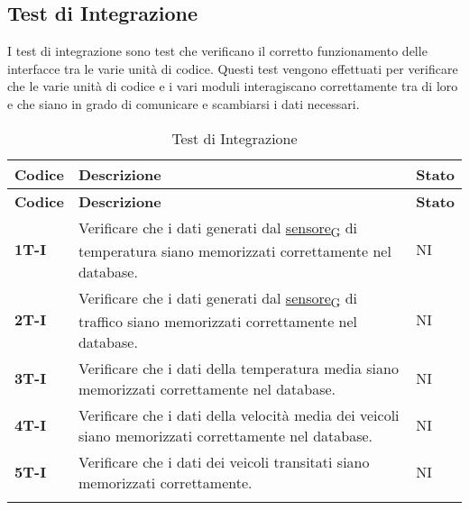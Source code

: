 \subsection{Test di Integrazione}
I test di integrazione sono test che verificano il corretto funzionamento delle interfacce tra le varie unità di codice. Questi test vengono effettuati per verificare che le varie unità di codice e i vari moduli interagiscano correttamente tra di loro e che siano in grado di comunicare e scambiarsi i dati necessari. \\
\begin{longtable}{|>{\raggedright\arraybackslash}m{}|>{\raggedright\arraybackslash}m{}|>{\raggedright\arraybackslash}m{}|}
	\hline
	\textbf{Codice} & \textbf{Descrizione}                                                                                    & \textbf{Stato} \\
	\hline
	\endfirsthead
	\hline
	\textbf{Codice} & \textbf{Descrizione}                                                                                    & \textbf{Stato} \\
	\endhead
	\textbf{1T-I}   & Verificare che i dati generati dal \href{https://7last.github.io/docs/rtb/documentazione-interna/glossario\#sensore}{sensore\textsubscript{G}} di temperatura siano memorizzati correttamente nel database. & NI             \\
	\hline
	\textbf{2T-I}   & Verificare che i dati generati dal \href{https://7last.github.io/docs/rtb/documentazione-interna/glossario\#sensore}{sensore\textsubscript{G}} di traffico siano memorizzati correttamente nel database.    & NI             \\
	\hline
	\textbf{3T-I}   & Verificare che i dati della temperatura media siano memorizzati correttamente nel database.             & NI             \\
	\hline
	\textbf{4T-I}   & Verificare che i dati della velocità media dei veicoli siano memorizzati correttamente nel database.    & NI             \\
	\hline
	\textbf{5T-I}   & Verificare che i dati dei veicoli transitati siano memorizzati correttamente.                           & NI             \\
	\hline
	\caption{Test di Integrazione}
\end{longtable}

